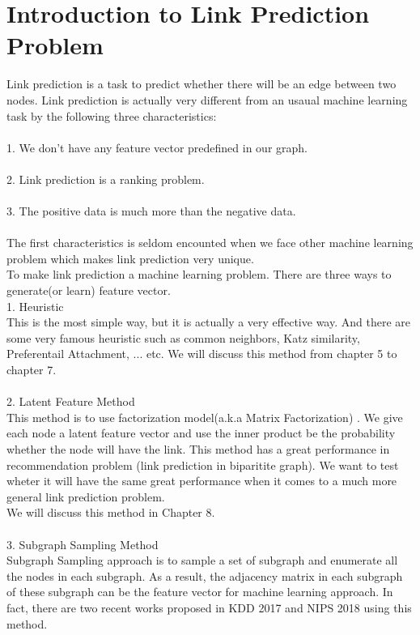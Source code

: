 \documentclass[12pt]{article}
\begin{document}
\section{Introduction to Link Prediction Problem}
Link prediction is a task to predict whether there will be an edge between two nodes. Link prediction is actually very different from an usaual machine learning task by the following three characteristics:
\\ \\
1. We don't have any feature vector predefined in our graph. 
\\ \\
2. Link prediction is a ranking problem.
\\ \\
3. The positive data is much more than the negative data. 
\\  \\
The first characteristics is seldom encounted when we face other machine learning problem which makes link prediction very unique.  \\
To make link prediction a machine learning problem. There are three ways to generate(or learn) feature vector. \\
1. Heuristic \\ 
This is the most simple way, but it is actually a very effective way. And there are some very famous heuristic such as common neighbors, Katz similarity, Preferentail Attachment, ... etc.  We will discuss this method from chapter 5 to chapter 7. \\ \\
2. Latent Feature Method \\
This method is to use factorization model(a.k.a Matrix Factorization) \cite{mf}. We give each node a latent feature vector and use the inner product be the probability whether the node will have the link. This method has a great performance in recommendation problem (link prediction in biparitite graph). We want to test wheter it will have the same great performance when it comes to a much more general link prediction problem. 
\\
We will discuss this method in Chapter 8.
\\ \\
3. Subgraph Sampling Method \\ 
Subgraph Sampling approach is to sample a set of subgraph and enumerate all the nodes in each subgraph. As a result, the adjacency matrix in each subgraph of these subgraph can be the feature vector for machine learning approach. In fact, there are two recent works proposed in KDD 2017 \cite{lp2017} and NIPS 2018 \cite{lp2018} using this method. 
\end{document}
